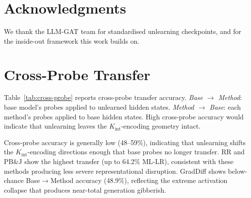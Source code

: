 \documentclass[11pt]{article}
\begin{document}
\section*{Acknowledgments}

We thank the LLM-GAT team for standardised unlearning checkpoints, and
\citet{gekhman2025insideout} for the inside-out framework this work builds on.



\appendix

\section{Cross-Probe Transfer}
\label{app:cross-probe}

Table~\ref{tab:cross-probe} reports cross-probe transfer accuracy.
\emph{Base $\to$ Method}: base model's probes applied to unlearned hidden states.
\emph{Method $\to$ Base}: each method's probes applied to base hidden states.
High cross-probe accuracy would indicate that unlearning leaves the
$K_\text{int}$-encoding geometry intact.

Cross-probe accuracy is generally low (48--59\%), indicating that unlearning
shifts the $K_\text{int}$-encoding directions enough that base probes no longer
transfer.
RR and PB\&J show the highest transfer (up to 64.2\% ML-LR), consistent with
these methods producing less severe representational disruption.
GradDiff shows below-chance Base$\to$Method accuracy (48.9\%), reflecting the
extreme activation collapse that produces near-total generation gibberish.
\end{document}
